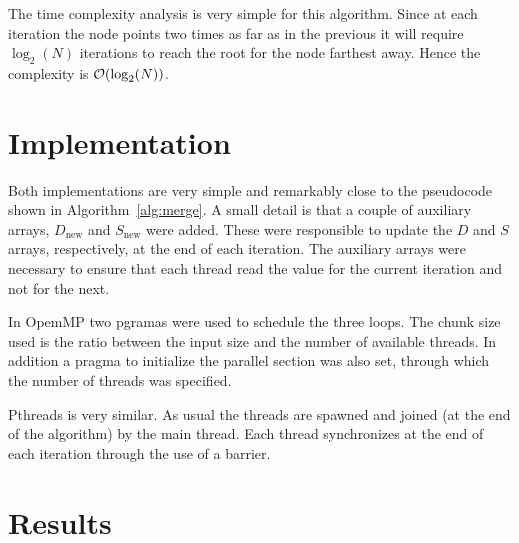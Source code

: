 The time complexity analysis is very simple for this algorithm. Since at each iteration the node points two times as far as in the previous it will require $\log_2(N)$ iterations to reach the root for the node farthest away. Hence the complexity is $\mathcal{O}(\log_2(N))$.


\section{Implementation}

Both implementations are very simple and remarkably close to the pseudocode shown in Algorithm~\ref{alg:merge}. A small detail is that a couple of auxiliary arrays, $D_\text{new}$ and $S_\text{new}$ were added. These were responsible to update the $D$ and $S$ arrays, respectively, at the end of each iteration. The auxiliary arrays were necessary to ensure that each thread read the value for the current iteration and not for the next.

In OpemMP two pgramas were used to schedule the three loops. The chunk size used is the ratio between the input size and the number of available threads. In addition a pragma to initialize the parallel section was also set, through which the number of threads was specified.

Pthreads is very similar. As usual the threads are spawned and joined (at the end of the algorithm) by the main thread.
Each thread synchronizes at the end of each iteration through the use of a barrier.

\section{Results}
\label{sec:results}


